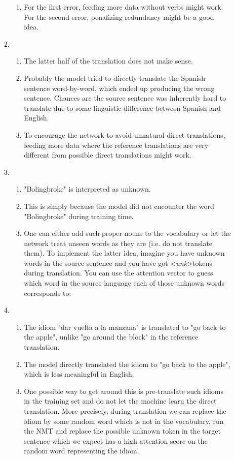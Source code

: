 \documentclass[12pt]{article}
\begin{document}
\begin{enumerate}[label=\textbf{\arabic*.}]
\begin{enumerate}[label=(\alph*)]
\begin{enumerate}[label=\roman*.]
\begin{enumerate}[label=\arabic*.]
        \item For the first error, feeding more data without verbs might work. For the second error, penalizing redundancy might be a good idea.
      \end{enumerate}
      \item
      \begin{enumerate}[label=\arabic*.]
        \item The latter half of the translation does not make sense.
        \item Probably the model tried to directly translate the Spanish sentence word-by-word, which ended up producing the wrong sentence. Chances are the source sentence was inherently hard to translate due to some linguistic difference between Spanish and English.
        \item To encourage the network to avoid unnatural direct translations, feeding more data where the reference translations are very different from possible direct translations might work.
      \end{enumerate}
      \item
      \begin{enumerate}[label=\arabic*.]
        \item "Bolingbroke" is interpreted as unknown.
        \item This is simply because the model did not encounter the word "Bolingbroke" during training time.
        \item One can either add such proper nouns to the vocabulary or let the network treat unseen words as they are (i.e. do not translate them). To implement the latter idea, imagine you have unknown words in the source sentence and you have got \textless\textit{unk}\textgreater tokens during translation. You can use the attention vector to guess which word in the source language each of those unknown words corresponds to.
      \end{enumerate}
      \item
      \begin{enumerate}[label=\arabic*.]
        \item The idiom "dar vuelta a la manzana" is translated to "go back to the apple", unlike "go around the block" in the reference translation.
        \item The model directly translated the idiom to "go back to the apple", which is less meaningful in English.
        \item One possible way to get around this is pre-translate such idioms in the training set and do not let the machine learn the direct translation. More precisely, during translation we can replace the idiom by some random word which is not in the vocabulary, run the NMT and replace the possible unknown token in the target sentence which we expect has a high attention score on the random word representing the idiom.

\end{enumerate}
\end{enumerate}
\end{enumerate}
\end{enumerate}
\end{document}
